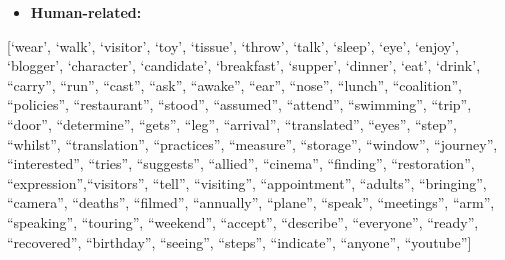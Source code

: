 \documentclass{clv3}
\providecommand{\tightlist}{%
  \setlength{\itemsep}{0pt}\setlength{\parskip}{0pt}}
\begin{document}
\begin{itemize}
\tightlist
\item
  \textbf{Human-related:}
\end{itemize}

{[}`wear', `walk', `visitor', `toy', `tissue', `throw', `talk', `sleep',
`eye', `enjoy', `blogger', `character', `candidate', `breakfast',
`supper', `dinner', `eat', `drink', ``carry'', ``run'', ``cast'',
``ask'', ``awake'', ``ear'', ``nose'', ``lunch'', ``coalition'',
``policies'', ``restaurant'', ``stood'', ``assumed'', ``attend'',
``swimming'', ``trip'', ``door'', ``determine'', ``gets'', ``leg'',
``arrival'', ``translated'', ``eyes'', ``step'', ``whilst'',
``translation'', ``practices'', ``measure'', ``storage'', ``window'',
``journey'', ``interested'', ``tries'', ``suggests'', ``allied'',
``cinema'', ``finding'', ``restoration'', ``expression'',``visitors'',
``tell'', ``visiting'', ``appointment'', ``adults'', ``bringing'',
``camera'', ``deaths'', ``filmed'', ``annually'', ``plane'', ``speak'',
``meetings'', ``arm'', ``speaking'', ``touring'', ``weekend'',
``accept'', ``describe'', ``everyone'', ``ready'', ``recovered'',
``birthday'', ``seeing'', ``steps'', ``indicate'', ``anyone'',
``youtube''{]}





























 
\end{document}
